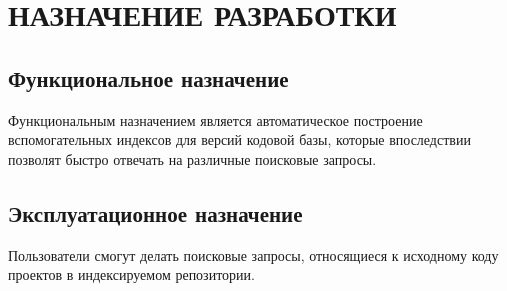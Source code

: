 \section{НАЗНАЧЕНИЕ РАЗРАБОТКИ}

\subsection{Функциональное назначение}
	Функциональным назначением является автоматическое построение вспомогательных индексов для версий кодовой базы, которые впоследствии позволят быстро отвечать на различные поисковые запросы.

\subsection{Эксплуатационное назначение}
	Пользователи смогут делать поисковые запросы, относящиеся к исходному коду проектов в индексируемом репозитории.

\clearpage